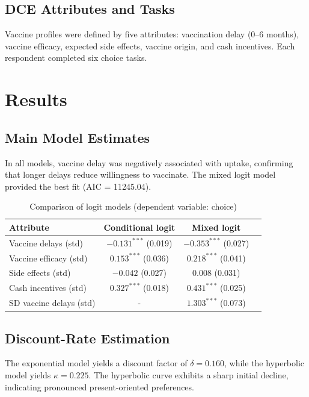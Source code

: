 \documentclass[preprint,12pt,authoryear]{elsarticle}
\begin{document}
\subsection{DCE Attributes and Tasks}
Vaccine profiles were defined by five attributes: vaccination delay (0--6 months), vaccine efficacy, expected side effects, vaccine origin, and cash incentives. Each respondent completed six choice tasks.

\section{Results}
\subsection{Main Model Estimates}
In all models, vaccine delay was negatively associated with uptake, confirming that longer delays reduce willingness to vaccinate. The mixed logit model provided the best fit (AIC = 11245.04).

\begin{table}[H]
\centering
\caption{Comparison of logit models (dependent variable: choice)}
\label{tab:models}
\begin{tabular}{lccc}
\toprule
Attribute & Conditional logit & Mixed logit \\
\midrule
Vaccine delays (std) & $-0.131^{***}$ (0.019) & $-0.353^{***}$ (0.027) \\
Vaccine efficacy (std) & $0.153^{***}$ (0.036) & $0.218^{***}$ (0.041) \\
Side effects (std) & $-0.042$ (0.027) & $0.008$ (0.031) \\
Cash incentives (std) & $0.327^{***}$ (0.018) & $0.431^{***}$ (0.025) \\
SD vaccine delays (std) & - & $1.303^{***}$ (0.073) \\
\bottomrule
\end{tabular}
\end{table}

\subsection{Discount-Rate Estimation}
The exponential model yields a discount factor of $\delta = 0.160$, while the hyperbolic model yields $\kappa = 0.225$. The hyperbolic curve exhibits a sharp initial decline, indicating pronounced present-oriented preferences.
\end{document}
